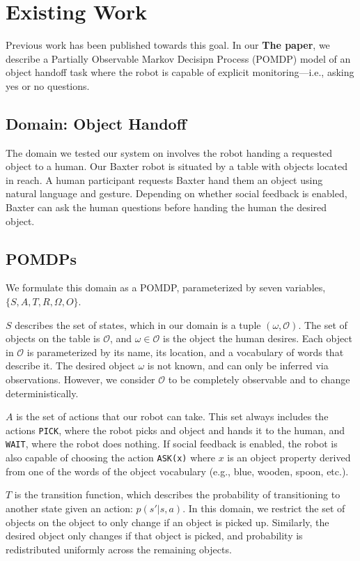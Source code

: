 \documentclass{article}
\begin{document}
\section{Existing Work}

Previous work has been published towards this goal. In our \textbf{The paper}, we describe a Partially Observable Markov Decisipn Process (POMDP) model of an object handoff task where the robot is capable of explicit monitoring---i.e., asking yes or no questions. 
 
\subsection{Domain: Object Handoff}

The domain we tested our system on involves the robot handing a requested object to a human. Our Baxter robot is situated by a table with objects located in reach. A human participant requests Baxter hand them an object using natural language and gesture. Depending on whether social feedback is enabled, Baxter can ask the human questions before handing the human the desired object. 

\subsection{POMDPs}

We formulate this domain as a POMDP, parameterized by seven variables, $\{S,A,T,R, \Omega, O\}$. 

$S$ describes the set of states, which in our domain is a tuple $(\omega, \mathcal{O})$. The set of objects on the table is $\mathcal{O}$, and $\omega \in \mathcal{O}$ is the object the human desires. Each object in $\mathcal{O}$ is parameterized by its name, its location, and a vocabulary of words that describe it. The desired object $\omega$ is not known, and can only be inferred via observations. However, we consider $\mathcal{O}$ to be completely observable and to change deterministically. 

$A$ is the set of actions that our robot can take. This set always includes the actions \texttt{PICK}, where the robot picks and object and hands it to the human, and \texttt{WAIT}, where the robot does nothing. If social feedback is enabled, the robot is also capable of choosing the action \texttt{ASK(x)} where $x$ is an object property derived from one of the words of the object vocabulary (e.g., blue, wooden, spoon, etc.). 

$T$ is the transition function, which describes the probability of transitioning to another state given an action: $p(s'|s, a)$. In this domain, we restrict the set of objects on the object to only change if an object is picked up. Similarly, the desired object only changes if that object is picked, and probability is redistributed uniformly across the remaining objects. 
\end{document}
